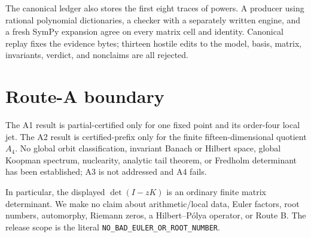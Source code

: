 \documentclass[10pt]{article}
\begin{document}
The canonical ledger also stores the first eight traces of powers.  A
producer using rational polynomial dictionaries, a checker with a separately
written engine, and a fresh SymPy expansion agree on every matrix cell and
identity.  Canonical replay fixes the evidence bytes; thirteen hostile edits
to the model, basis, matrix, invariants, verdict, and nonclaims are all
rejected.

\section{Route-A boundary}
The A1 result is partial-certified only for one fixed point and its order-four
local jet.  The A2 result is certified-prefix only for the finite
fifteen-dimensional quotient $A_4$.  No global orbit classification,
invariant Banach or Hilbert space, global Koopman spectrum, nuclearity,
analytic tail theorem, or Fredholm determinant has been established; A3 is
not addressed and A4 fails.

In particular, the displayed $\det(I-zK)$ is an ordinary finite matrix
determinant.  We make no claim about arithmetic/local data, Euler factors,
root numbers, automorphy, Riemann zeros, a Hilbert--P\'olya operator, or Route
B.  The release scope is the literal
\texttt{NO\_BAD\_EULER\_OR\_ROOT\_NUMBER}.
\end{document}
